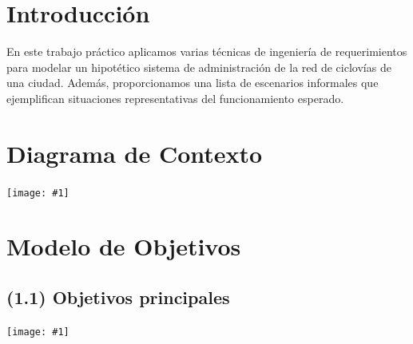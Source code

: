 \documentclass[a4paper, 10pt, twoside]{article}
\newcommand{\diagrama}[1]{
  \texttt{[image: \#1]}
}
\begin{document}
\newpage




\tableofcontents

\newpage




\section{Introducción}

En este trabajo práctico aplicamos varias técnicas de ingeniería de requerimientos para modelar un hipotético sistema de administración de la red de ciclovías de una ciudad. Además, proporcionamos una lista de escenarios informales que ejemplifican situaciones representativas del funcionamiento esperado.




\section{Diagrama de Contexto}

\diagrama{diagrama-de-contexto}




\section{Modelo de Objetivos}


\subsection{(1.1)  Objetivos principales}
\diagrama{objetivos-1.1}
\end{document}
